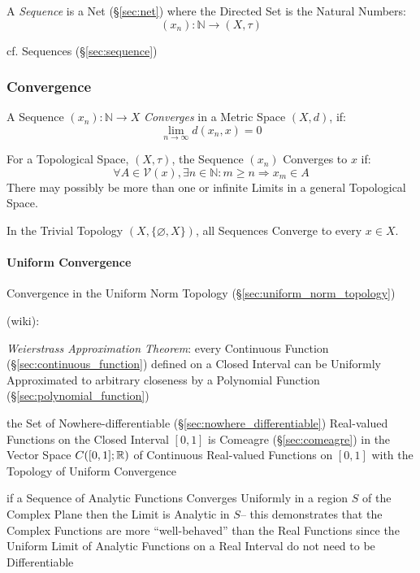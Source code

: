 A \emph{Sequence} is a Net (\S\ref{sec:net}) where the Directed Set is
the Natural Numbers:
\[
  (x_n) : \mathbb{N} \rightarrow (X,\tau)
\]

cf. Sequences (\S\ref{sec:sequence})



\subsubsection{Convergence}\label{sec:convergence}

A Sequence $(x_n) : \mathbb{N} \rightarrow X$ \emph{Converges} in a Metric
Space $(X,d)$, if:
\[
  \lim_{n \rightarrow \infty} d (x_n, x) = 0
\]

For a Topological Space, $(X,\tau)$, the Sequence $(x_n)$ Converges to
$x$ if:
\[
  \forall A \in \mathcal{V}(x), \exists n \in \mathbb{N}
  : m \geq n \Rightarrow x_m \in A
\]
There may possibly be more than one or infinite Limits in a general
Topological Space.

In the Trivial Topology $(X, \{\varnothing, X\})$, all Sequences
Converge to every $x \in X$.



\paragraph{Uniform Convergence}\label{sec:uniform_convergence}\hfill

Convergence in the Uniform Norm Topology (\S\ref{sec:uniform_norm_topology})

(wiki):

\emph{Weierstrass Approximation Theorem}: every Continuous Function
(\S\ref{sec:continuous_function}) defined on a Closed Interval can be Uniformly
Approximated to arbitrary closeness by a Polynomial Function
(\S\ref{sec:polynomial_function})

the Set of Nowhere-differentiable (\S\ref{sec:nowhere_differentiable})
Real-valued Functions on the Closed Interval $[0,1]$ is Comeagre
(\S\ref{sec:comeagre}) in the Vector Space $C([0,1]; \mathbb{R})$ of Continuous
Real-valued Functions on $[0,1]$ with the Topology of Uniform Convergence

if a Sequence of Analytic Functions Converges Uniformly in a region $S$ of the
Complex Plane then the Limit is Analytic in $S$-- this demonstrates that the
Complex Functions are more ``well-behaved'' than the Real Functions since the
Uniform Limit of Analytic Functions on a Real Interval do not need to be
Differentiable



